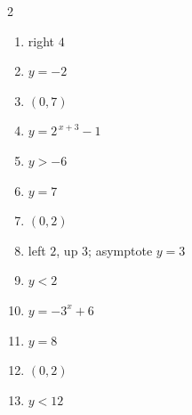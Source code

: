 \documentclass[11pt]{article}
\begin{document}
\begin{keybox}
\begin{multicols}{2}
\small
\begin{enumerate}[leftmargin=*,itemsep=3pt]
  \item right $4$
  \item $y=-2$
  \item $(0,7)$
  \item $y=2^{\,x+3}-1$
  \item $y>-6$
  \item $y=7$
  \item $(0,2)$
  \item left $2$, up $3$; asymptote $y=3$
  \item $y<2$
  \item $y=-3^{x}+6$
  \item $y=8$
  \item $(0,2)$
  \item $y<12$
\end{enumerate}
\end{multicols}
\end{keybox}
\end{document}
